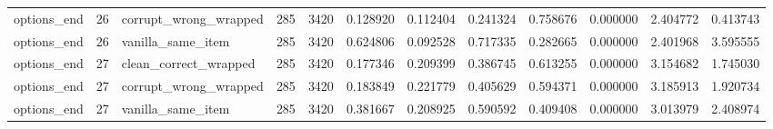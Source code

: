 \begin{tabular}{lrlrrrrrrrrr}
options\_end & 26 & corrupt\_wrong\_wrapped & 285 & 3420 & 0.128920 & 0.112404 & 0.241324 & 0.758676 & 0.000000 & 2.404772 & 0.413743 \\
options\_end & 26 & vanilla\_same\_item & 285 & 3420 & 0.624806 & 0.092528 & 0.717335 & 0.282665 & 0.000000 & 2.401968 & 3.595555 \\
options\_end & 27 & clean\_correct\_wrapped & 285 & 3420 & 0.177346 & 0.209399 & 0.386745 & 0.613255 & 0.000000 & 3.154682 & 1.745030 \\
options\_end & 27 & corrupt\_wrong\_wrapped & 285 & 3420 & 0.183849 & 0.221779 & 0.405629 & 0.594371 & 0.000000 & 3.185913 & 1.920734 \\
options\_end & 27 & vanilla\_same\_item & 285 & 3420 & 0.381667 & 0.208925 & 0.590592 & 0.409408 & 0.000000 & 3.013979 & 2.408974 \\
\bottomrule
\end{tabular}
